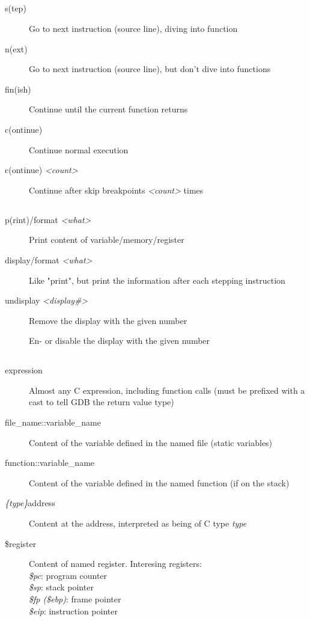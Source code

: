 \documentclass[10pt,landscape,a4paper]{article}
\newcommand{\blacksubsection}[1]{\subsection{\colorbox{black}{\makebox[\linewidth][c]{\textcolor{white}{#1}}}}}
\begin{document}
\begin{multicols}{3}
    \blacksubsection{Stepping}
      \begin{description}
        \item[s(tep)] Go to next instruction (source line), diving into function
        \item[n(ext)] Go to next instruction (source line), but don't dive into functions
        \item[fin(ish)] Continue until the current function returns
        \item[c(ontinue)] Continue normal execution
        \item[c(ontinue) \textit{<count>}] Continue after skip breakpoints \textit{<count>} times
      \end{description}

    \blacksubsection{Variables}
      \begin{description}
        \item[p(rint)/format \textit{<what>}] Print content of variable/memory/register
        \item[display/format \textit{<what>}] Like "print", but print the information after each stepping instruction
        \item[undisplay \textit{<display\#>}] Remove the display with the given number
        \item[\parbox{6cm}{ \vspace{0.1cm} enable display \textit{<display\#>} \\ disable display \textit{<display\#>} \vspace{0.1cm}}]
              En- or disable the display with the given number
      \end{description}

    \blacksubsection{<what>}
      \begin{description}
        \item[expression] Almost any C expression, including function calls (must be prefixed with a cast to tell GDB the return value type)
        \item[file\_name::variable\_name] Content of the variable defined in the named file (static variables)
        \item[function::variable\_name] Content of the variable defined in the named function (if on the stack)
        \item[\textit{\{type\}}address] Content at the address, interpreted as being of C type \textit{type}
        \item[\$register] \parbox{8cm}{Content of named register. Interesing registers: \\
                                       \textit{\$pc}: program counter\\
                                       \textit{\$sp}: stack pointer\\
                                       \textit{\$fp (\$ebp)}: frame pointer\\
                                       \textit{\$eip}: instruction pointer}
      \end{description}


\end{multicols}
\end{document}
